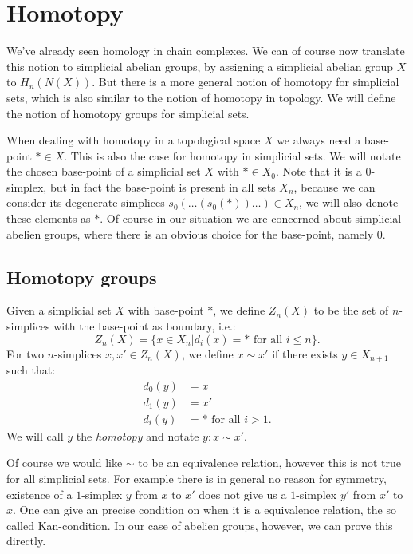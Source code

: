 \section{Homotopy}
\label{sec:Homotopy}

We've already seen homology in chain complexes. We can of course now translate this notion to simplicial abelian groups, by assigning a simplicial abelian group $X$ to $H_n(N(X))$. But there is a more general notion of homotopy for simplicial sets, which is also similar to the notion of homotopy in topology. We will define the notion of homotopy groups for simplicial sets.

When dealing with homotopy in a topological space $X$ we always need a base-point $\ast \in X$. This is also the case for homotopy in simplicial sets. We will notate the chosen base-point of a simplicial set $X$ with $\ast \in X_0$. Note that it is a $0$-simplex, but in fact the base-point is present in all sets $X_n$, because we can consider its degenerate simplices $s_0(\ldots(s_0(\ast))\ldots) \in X_n$, we will also denote these elements as $\ast$. Of course in our situation we are concerned about simplicial abelien groups, where there is an obvious choice for the base-point, namely $0$.

\subsection{Homotopy groups}
\begin{definition}
	Given a simplicial set $X$ with base-point $\ast$, we define $Z_n(X)$ to be the set of $n$-simplices with the base-point as boundary, i.e.:
	$$ Z_n(X) = \{ x \in X_n | d_i(x) = \ast \text{ for all } i \leq n \}. $$
	For two $n$-simplices $x, x' \in Z_n(X)$, we define $x \sim x'$ if there exists $y \in X_{n+1}$ such that:
	\begin{align}
		d_0(y) &= x \\
		d_1(y) &= x' \\
		d_i(y) &= \ast \text{ for all } i > 1.
	\end{align}
	We will call $y$ the \emph{homotopy} and notate $y: x \sim x'$.
\end{definition}

Of course we would like $\sim$ to be an equivalence relation, however this is not true for all simplicial sets. For example there is in general no reason for symmetry, existence of a $1$-simplex $y$ from $x$ to $x'$ does not give us a $1$-simplex $y'$ from $x'$ to $x$. One can give an precise condition on when it is a equivalence relation, the so called Kan-condition. In our case of abelien groups, however, we can prove this directly.

